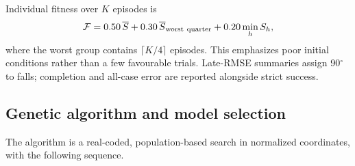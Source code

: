 \documentclass{styles/svproc}
\begin{document}
Individual fitness over $K$ episodes is
\begin{equation}
 \mathcal F=0.50\,\overline S+0.30\,\overline{S}_{\rm worst\ quarter}
                    +0.20\min_h S_h,
 \label{eq:aggregate}
\end{equation}
where the worst group contains $\lceil K/4\rceil$ episodes. This emphasizes poor initial conditions rather than a few favourable trials. Late-RMSE summaries assign 90$^\circ$ to falls; completion and all-case error are reported alongside strict success.

\subsection{Genetic algorithm and model selection}
\label{sec:search}
The algorithm is a real-coded, population-based search in normalized coordinates, with the following sequence.
\end{document}
